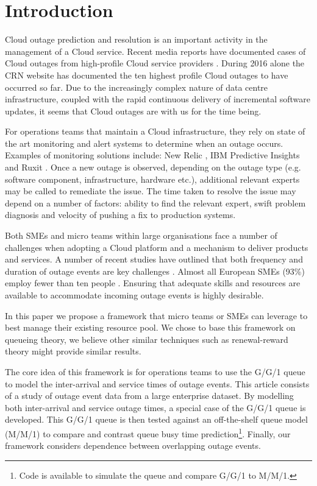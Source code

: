 \documentclass[5p]{elsarticle}
\begin{document}
\linenumbers

\section{Introduction}
\label{sec:intro}
Cloud outage prediction and resolution is an important activity in the management of a Cloud service. Recent media reports have documented cases of Cloud outages from high-profile Cloud service providers \cite{CRN2016outage}. During 2016 alone the CRN website has documented the ten highest profile Cloud outages to have occurred so far.  Due to the increasingly complex nature of data centre infrastructure, coupled with the rapid continuous delivery of incremental software updates, it seems that Cloud outages are with us for the time being.


For operations teams that maintain a Cloud infrastructure, they rely on state of the art monitoring and alert systems to determine when an outage occurs. Examples of monitoring solutions include: New Relic \cite{newrelic}, IBM Predictive Insights \cite{predinsight} and Ruxit \cite{ruxit}. Once a new outage is observed, depending on the outage type (e.g. software component, infrastructure, hardware etc.), additional relevant experts may be called to remediate the issue. The time taken to resolve the issue may depend on a number of factors: ability to find the relevant expert, swift problem diagnosis and velocity of pushing a fix to production systems. 

Both SMEs and micro teams within large organisations face a number of challenges when adopting a Cloud platform and a mechanism to deliver products and services. A number of recent studies have outlined that both frequency and duration of outage events are key challenges \cite{InfoWorld2015outage}. Almost all European SMEs (93\%) employ fewer than ten people \cite{europa2015sme}. Ensuring that adequate skills and resources are available to accommodate incoming outage events is highly desirable.

In this paper we propose a framework that micro teams or SMEs can leverage to best manage their existing resource pool. We chose to base this framework on queueing theory, we believe other similar techniques such as renewal-reward theory might provide similar results.

The core idea of this framework is for operations teams to use the G/G/1 queue to model the inter-arrival and service times of outage events. This article consists of a study of outage event data from a large enterprise dataset. By modelling both inter-arrival and service outage times, a special case of the G/G/1 queue is developed. This G/G/1 queue is then tested against an off-the-shelf queue model (M/M/1) to compare and contrast queue busy time prediction\footnote{Code is available to simulate the queue and compare G/G/1 to M/M/1.}. Finally, our framework considers dependence between overlapping outage events. 
\end{document}
